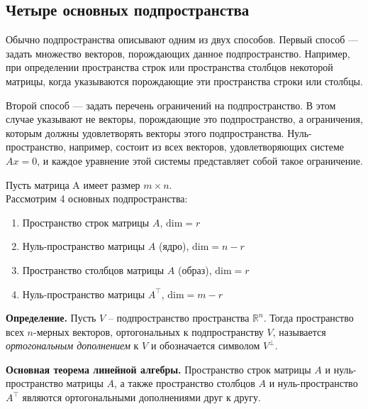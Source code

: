 \documentclass[11pt,a4paper]{article}
\providecommand{\tightlist}{%
      \setlength{\itemsep}{0pt}\setlength{\parskip}{0pt}}
\begin{document}
\hypertarget{ux447ux435ux442ux44bux440ux435-ux43eux441ux43dux43eux432ux43dux44bux445-ux43fux43eux434ux43fux440ux43eux441ux442ux440ux430ux43dux441ux442ux432ux430}{%
\subsection{Четыре основных
подпространства}\label{ux447ux435ux442ux44bux440ux435-ux43eux441ux43dux43eux432ux43dux44bux445-ux43fux43eux434ux43fux440ux43eux441ux442ux440ux430ux43dux441ux442ux432ux430}}

Обычно подпространства описывают одним из двух способов.
Первый способ --- задать множество векторов, порождающих данное подпространство.
Например, при определении пространства строк или пространства столбцов некоторой матрицы, когда указываются порождающие эти пространства строки или столбцы.

Второй способ --- задать перечень ограничений на подпространство.
В этом случае указывают не векторы, порождающие это подпространство, а ограничения, которым должны удовлетворять векторы этого подпространства.
Нуль-пространство, например, состоит из всех векторов, удовлетворяющих системе \(Ax=0\), и каждое уравнение этой системы представляет собой такое ограничение.

Пусть матрица A имеет размер \(m \times n\).\\
Рассмотрим 4 основных подпространства:

\begin{enumerate}
\def\labelenumi{\arabic{enumi}.}
\tightlist
\item
  Пространство строк матрицы \(A\), \(\mathrm{dim} = r\)
\item
  Нуль-пространство матрицы \(A\) (ядро), \(\mathrm{dim} = n-r\)
\item
  Пространство столбцов матрицы \(A\) (образ), \(\mathrm{dim} = r\)
\item
  Нуль-пространство матрицы \(A^\top\), \(\mathrm{dim} = m-r\)
\end{enumerate}

    \textbf{Определение.} Пусть \(V\) -- подпространство пространства
\(\mathbb{R}^n\). Тогда пространство всех \(n\)-мерных векторов,
ортогональных к подпространству \(V\), называется \emph{ортогональным
дополнением} к \(V\) и обозначается символом \(V^\perp\).

\textbf{Основная теорема линейной алгебры.} Пространство строк матрицы \(A\) и нуль-пространство матрицы \(A\), а также пространство столбцов \(A\) и нуль-пространство \(A^\top\) являются ортогональными дополнениями друг к другу.
\end{document}
